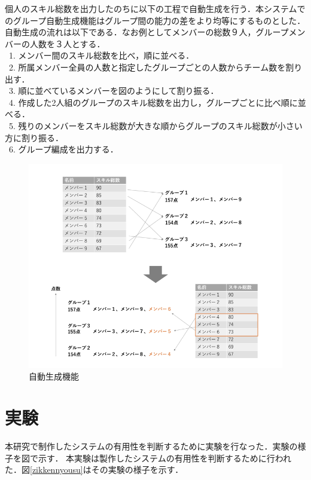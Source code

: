 \documentclass{funthesis}
\begin{document}
個人のスキル総数を出力したのちに以下の工程で自動生成を行う．本システムでのグループ自動生成機能はグループ間の能力の差をより均等にするものとした．自動生成の流れは以下である．なお例としてメンバーの総数９人，グループメンバーの人数を３人とする．\\
\ 1. メンバー間のスキル総数を比べ，順に並べる．\\
\ 2. 所属メンバー全員の人数と指定したグループごとの人数からチーム数を割り出す．\\
\ 3. 順に並べているメンバーを図のようにして割り振る．\\
\ 4. 作成した2人組のグループのスキル総数を出力し，グループごとに比べ順に並べる．\\
\ 5. 残りのメンバーをスキル総数が大きな順からグループのスキル総数が小さい方に割り振る．\\
\ 6. グループ編成を出力する．\\
\begin{figure}[h]
 \centering
   \includegraphics[width=150mm]{figures/auto.png}
 \caption{自動生成機能}
 \label{auto}
\end{figure}





\chapter{実験}
本研究で制作したシステムの有用性を判断するために実験を行なった．実験の様子を図で示す．
本実験は製作したシステムの有用性を判断するために行われた．図\ref{zikkennyousu}はその実験の様子を示す．
\end{document}
